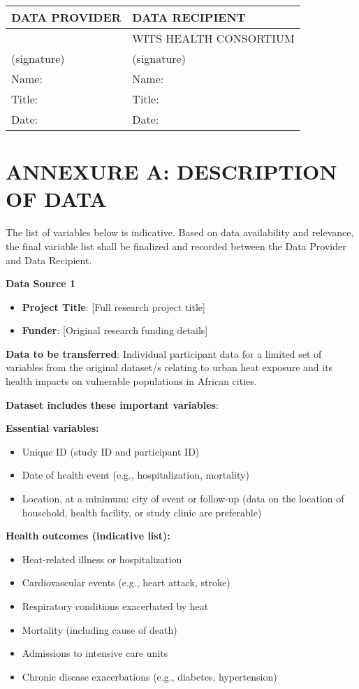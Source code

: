 \documentclass[12pt,letterpaper]{article}
\begin{document}
\begin{tabular}{|p{}|p{}|}
\hline
\textbf{DATA PROVIDER} & \textbf{DATA RECIPIENT} \\
\hline
 & WITS HEALTH CONSORTIUM \\
\hline
(signature) & (signature) \\
\hline
Name: & Name: \\
\hline
Title: & Title: \\
\hline
Date: & Date: \\
\hline
\end{tabular}

\newpage

\section*{ANNEXURE A: DESCRIPTION OF DATA}

The list of variables below is indicative. Based on data availability and relevance, the final variable list shall be finalized and recorded between the Data Provider and Data Recipient.

\textbf{Data Source 1}

\begin{itemize}
    \item \textbf{Project Title}: [Full research project title]
    \item \textbf{Funder}: [Original research funding details]
\end{itemize}

\textbf{Data to be transferred}: Individual participant data for a limited set of variables from the original dataset/s relating to urban heat exposure and its health impacts on vulnerable populations in African cities.

\textbf{Dataset includes these important variables}:

\textbf{Essential variables:}
\begin{itemize}
    \item Unique ID (study ID and participant ID)
    \item Date of health event (e.g., hospitalization, mortality)
    \item Location, at a minimum: city of event or follow-up (data on the location of household, health facility, or study clinic are preferable)
\end{itemize}

\textbf{Health outcomes (indicative list):}
\begin{itemize}
    \item Heat-related illness or hospitalization
    \item Cardiovascular events (e.g., heart attack, stroke)
    \item Respiratory conditions exacerbated by heat
    \item Mortality (including cause of death)
    \item Admissions to intensive care units
    \item Chronic disease exacerbations (e.g., diabetes, hypertension)
\end{itemize}
\end{document}
